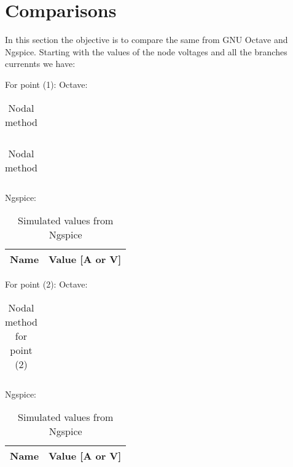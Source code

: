 \section{Comparisons}
\label{sec:comparisons}

In this section the objective is to compare the same from GNU Octave and Ngspice. 
Starting with the values of the node voltages and all the branches currennts we have: 

\vspace{0.5cm}
For point (1):
Octave: 
\FloatBarrier
\begin{table}[h]
  \centering
  \begin{tabular}{|c|c|c|c|c|c|c|}
    \hline    
    
    \hline
  \end{tabular}
  \caption{Nodal method}
  \label{tab:nodal}
\end{table}
\FloatBarrier  

\FloatBarrier
\begin{table}[h]
  \centering
  \begin{tabular}{|c|c|c|c|c|c|c|}
    \hline    
    
    \hline
  \end{tabular}
  \caption{Nodal method}
  \label{tab:nodal}
\end{table}
\FloatBarrier 

Ngspice: 
\FloatBarrier
\begin{table}[h]
  \centering
  \begin{tabular}{|l|r|}
    \hline    
    {\bf Name} & {\bf Value [A or V]} \\ \hline
    
  \end{tabular}
  \caption{Simulated values from Ngspice}
  \label{tab:op}
\end{table}
\FloatBarrier



\vspace{0.5cm} 
For point (2): 
Octave:
\vspace{0.2cm}
\FloatBarrier
\begin{table}[h]
  \centering
  \begin{tabular}{|c|c|c|c|c|c|c|}
    \hline    
    
    \hline
  \end{tabular}
  \caption{Nodal method for point (2)}
  \label{tab:nodal}
\end{table}
\FloatBarrier   

Ngspice:
\FloatBarrier
\begin{table}[h]
  \centering
  \begin{tabular}{|l|r|}
    \hline    
    {\bf Name} & {\bf Value [A or V]} \\ \hline
    
  \end{tabular}
  \caption{Simulated values from Ngspice}
  \label{tab:op}
\end{table}
\FloatBarrier








